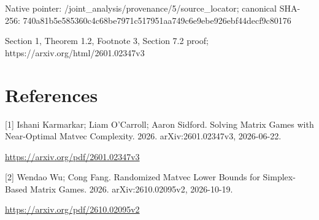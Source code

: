 \documentclass[10pt,a4paper]{article}
\begin{document}
Native pointer: /joint\_analysis/provenan\allowbreak{}ce/5/source\_locator; canonical SHA-256: 740a81b5e585360c4c68be79\allowbreak{}71c517951aa749c6e9ebe926\allowbreak{}ebf44decf9c80176


Section 1, Theorem 1.2, Footnote 3, Section 7.2 proof; https://arxiv.org/html/2601.02347v3


\section{References}


[1] Ishani Karmarkar; Liam O'Carroll; Aaron Sidford. Solving Matrix Games with Near-Optimal Matvec Complexity. 2026. arXiv:2601.02347v3, 2026-06-22.



\url{https://arxiv.org/pdf/2601.02347v3}



[2] Wendao Wu; Cong Fang. Randomized Matvec Lower Bounds for Simplex-Based Matrix Games. 2026. arXiv:2610.02095v2, 2026-10-19.



\url{https://arxiv.org/pdf/2610.02095v2}
\end{document}
